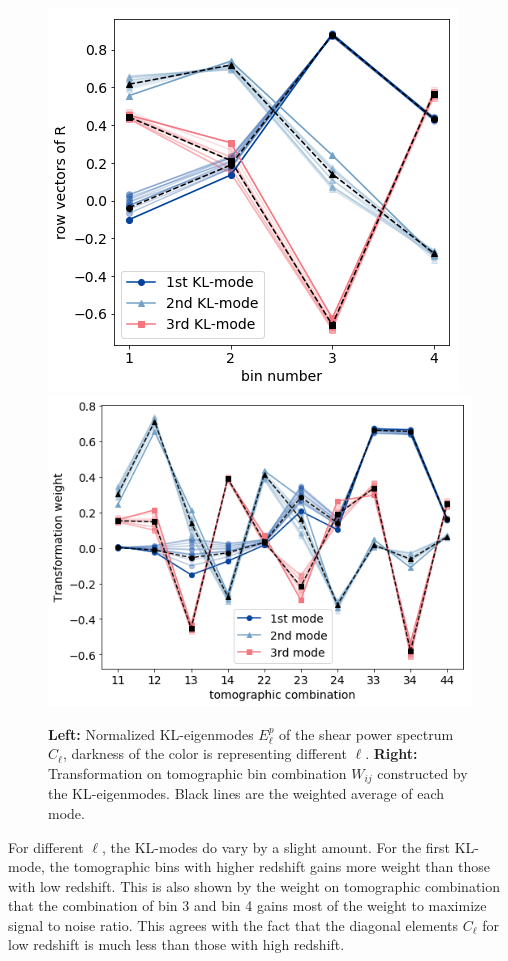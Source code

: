\documentclass[twocolumn]{\docclass}
\begin{document}
	\begin{figure}
		\includegraphics[width=0.80\columnwidth]{epi.png}
		\includegraphics[width=1.02\columnwidth]{Wij.png}
		\caption{\textbf{Left:} Normalized KL-eigenmodes $E_\ell^p$ of the shear power spectrum $C_{\ell}$, darkness of the color is representing different $\ell$. \textbf{Right:} Transformation on tomographic bin combination $W_{ij}$ constructed by the KL-eigenmodes. Black lines are the weighted average of each mode. \label{fig:kl-mode}}
	\end{figure}
	
	For different $\ell$, the KL-modes do vary by a slight amount. For the first KL-mode, the tomographic bins with higher redshift gains more weight than those with low redshift. This is also shown by the weight on tomographic combination that the combination of bin 3 and bin 4 gains most of the weight to maximize signal to noise ratio. This agrees with the fact that the diagonal elements $C_\ell$ for low redshift is much less than those with high redshift. 
	
\end{document}
